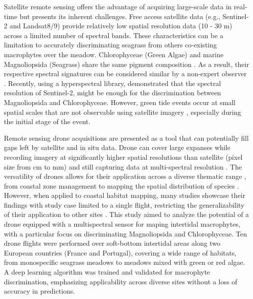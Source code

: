 \documentclass[
  number]{elsarticle}
\begin{document}
Satellite remote sensing offers the advantage of acquiring large-scale
data in real-time but presents its inherent challenges. Free access
satellite data (e.g., Sentinel-2 and Landsat8/9) provide relatively low
spatial resolution data (10 - 30 m) across a limited number of spectral
bands. These characteristics can be a limitation to accurately
discriminating seagrass from others co-existing macrophytes over the
meadow. Chlorophyceae (Green Algae) and marine Magnoliopsida (Seagrass)
share the same pigment composition \citetext{\citealp[
]{ralph2002}; \citealp{Douay2022}}. As a result, their respective
spectral signatures can be considered similar by a non-expert observer
\citetext{\citealp[ ]{Davies2023}; \citealp{bannari2022}}. Recently,
using a hyperspectral library, \citep{Davies2023} demonstrated that the
spectral resolution of Sentinel-2, might be enough for the
discrimination between Magnoliopsida and Chlorophyceae. However, green
tide events occur at small spatial scales that are not observable using
satellite imagery \citep{tuya2013}, especially during the initial stage
of the event.

Remote sensing drone acquisitions are presented as a tool that can
potentially fill gaps left by satellite and in situ data. Drone can
cover large expanses while recording imagery at significantly higher
spatial resolutions than satellite (pixel size from cm to mm) and still
capturing data at multi-spectral resolution \citetext{\citealp[
]{fairley2022drone}; \citealp{oh2017use}}. The versatility of drones
allows for their application across a diverse thematic range , from
coastal zone management \citetext{\citealp[ ]{adade2021}; \citealp[
]{casella2020}; \citealp{angnuureng2022}} to mapping the spatial
distribution of species \citetext{\citealp[ ]{joyce2023}; \citealp[
]{tallam2023}; \citealp[ ]{Roca2022}; \citealp[
]{Roman2021}; \citealp{Brunier2022Topographic}}. However, when applied
to coastal habitat mapping, many studies showcase their findings with
study case limited to a single flight, restricting the generalizability
of their application to other sites \citetext{\citealp[
]{Roman2021}; \citealp[ ]{collin2019improving}; \citealp[
]{rossiter2020uav}; \citealp{Brunier2022Topographic}}. This study aimed
to analyze the potential of a drone equipped with a multispectral sensor
for maping intertidal macrophytes, with a particular focus on
discriminating Magnoliopsida and Chlorophyceae. Ten drone flights were
performed over soft-bottom intertidal areas along two European countries
(France and Portugal), covering a wide range of habitats, from
monospecific seagrass meadows to meadows mixed with green or red algae.
A deep learning algorithm was trained and validated for macrophyte
discrimination, emphasizing applicability across diverse sites without a
loss of accuracy in predictions.


  
\end{document}
